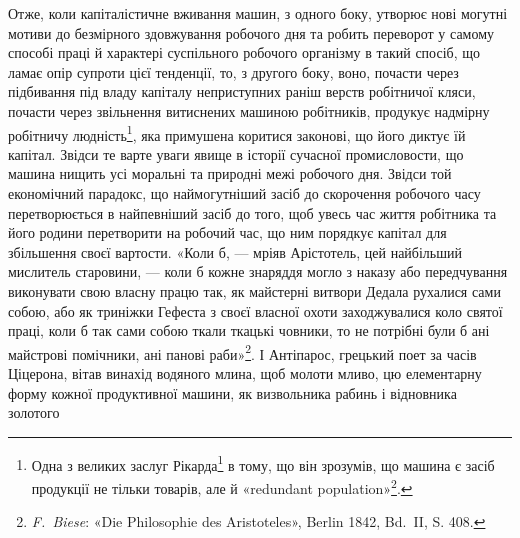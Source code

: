 Отже, коли капіталістичне вживання машин, з одного боку,
утворює нові могутні мотиви до безмірного здовжування робочого
дня та робить переворот у самому способі праці й характері суспільного
робочого організму в такий спосіб, що ламає опір супроти
цієї тенденції, то, з другого боку, воно, почасти через підбивання
під владу капіталу неприступних раніш верств робітничої кляси,
почасти через звільнення витиснених машиною робітників, продукує
надмірну робітничу людність\footnote{
Одна з великих заслуг Рікарда\footnote*{
У французькому виданні тут сказано: «Одна з заслуг Сісмонді
та Рікарда в тому, що вони зрозуміли і~». 
} в тому, що він зрозумів, що
машина є засіб продукції не тільки товарів, але й «redundant
population»\footnote*{
надмірної людности. 
}.
}, яка примушена коритися
законові, що його диктує їй капітал. Звідси те варте уваги явище в
історії сучасної промисловости, що машина нищить усі моральні та
природні межі робочого дня. Звідси той економічний парадокс, що
наймогутніший засіб до скорочення робочого часу перетворюється
в найпевніший засіб до того, щоб увесь час життя робітника та
його родини перетворити на робочий час, що ним порядкує капітал
для збільшення своєї вартости. «Коли б, — мріяв Арістотель,
цей найбільший мислитель старовини, — коли б кожне знаряддя
могло з наказу або передчування виконувати свою власну працю
так, як майстерні витвори Дедала рухалися сами собою, або як
триніжки Гефеста з своєї власної охоти заходжувалися коло святої
праці, коли б так сами собою ткали ткацькі човники, то не потрібні
були б ані майстрові помічники, ані панові раби»\footnote{
\emph{F.~Biese}: «Die Philosophie des Aristoteles», Berlin 1842, Bd.~II,
S. 408.
}. І Антіпарос,
грецький поет за часів Ціцерона, вітав винахід водяного
млина, щоб молоти мливо, цю елементарну форму кожної
продуктивної машини, як визвольника рабинь і відновника золотого
